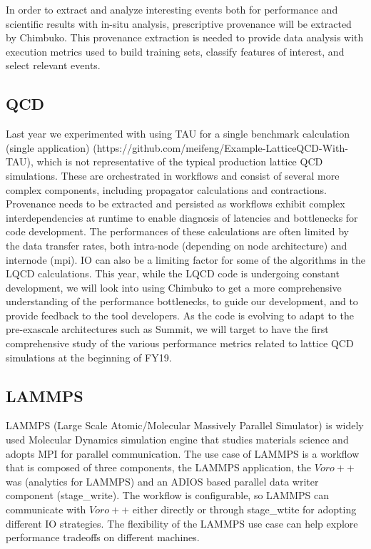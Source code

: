 In order to extract and analyze interesting events both for performance and scientific results with in-situ analysis, prescriptive provenance will be extracted by Chimbuko.  This provenance extraction is needed to provide data analysis with execution metrics used to build training sets, classify features of interest, and select relevant events. 


\subsection{QCD}
Last year we experimented with using TAU for a single benchmark calculation (single application) (https://github.com/meifeng/Example-LatticeQCD-With-TAU), which is not representative of the typical production lattice QCD simulations.  These are orchestrated in workflows and consist of several more complex components, including propagator calculations and contractions. Provenance needs to be extracted and persisted as workflows exhibit complex interdependencies at runtime to enable diagnosis of latencies and bottlenecks for code development. The performances of these calculations are often limited by the data transfer rates, both intra-node (depending on node architecture) and internode (mpi). IO can also be a limiting factor for some of the algorithms in the LQCD calculations. This year, while the LQCD code is undergoing constant development, we will look into using Chimbuko to get a more comprehensive understanding of the performance bottlenecks, to guide our development, and to provide feedback to the tool developers. As the code is evolving to adapt to the pre-exascale architectures such as Summit, we will target to have the first comprehensive study of the various performance metrics related to lattice QCD simulations at the beginning of FY19. 

\subsection {LAMMPS}

LAMMPS (Large Scale Atomic/Molecular Massively Parallel Simulator)  is widely used Molecular Dynamics simulation engine that studies materials science and adopts MPI for parallel communication. The use case of LAMMPS is a workflow that is composed of three components, the LAMMPS application, the $Voro++$ was (analytics for LAMMPS) and an ADIOS based parallel data writer component (stage\_write). The workflow is configurable, so LAMMPS can communicate with $Voro++$ either directly or through stage\_wtite for adopting different IO strategies. The flexibility of the LAMMPS use case can help explore performance tradeoffs on different machines.

